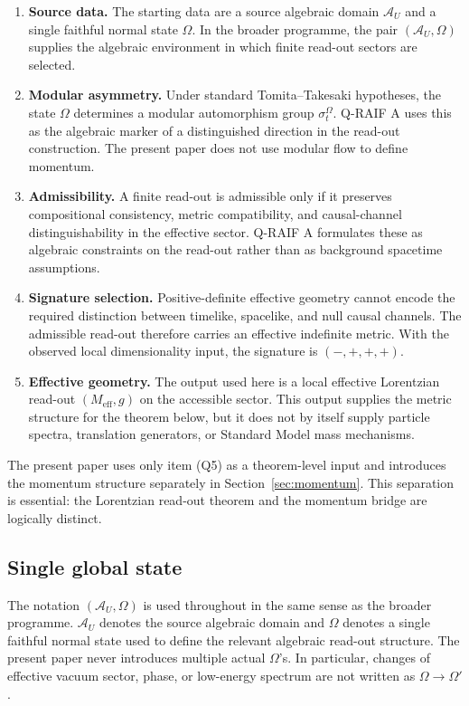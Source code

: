 \documentclass[12pt,a4paper]{article}
\theoremstyle{definition}
\theoremstyle{remark}
\newcommand{\AU}{\mathcal{A}_U}
\newcommand{\Meff}{M_{\mathrm{eff}}}
\newcommand{\Omegastate}{\Omega}
\begin{document}
\begin{enumerate}[label=(Q\arabic*), leftmargin=*]
\item \textbf{Source data.} The starting data are a source algebraic domain $\AU$ and a single faithful normal state $\Omegastate$. In the broader programme, the pair $(\AU,\Omegastate)$ supplies the algebraic environment in which finite read-out sectors are selected.
\item \textbf{Modular asymmetry.} Under standard Tomita--Takesaki hypotheses, the state $\Omegastate$ determines a modular automorphism group $\sigma_t^\Omegastate$. Q-RAIF A uses this as the algebraic marker of a distinguished direction in the read-out construction. The present paper does not use modular flow to define momentum.
\item \textbf{Admissibility.} A finite read-out is admissible only if it preserves compositional consistency, metric compatibility, and causal-channel distinguishability in the effective sector. Q-RAIF A formulates these as algebraic constraints on the read-out rather than as background spacetime assumptions.
\item \textbf{Signature selection.} Positive-definite effective geometry cannot encode the required distinction between timelike, spacelike, and null causal channels. The admissible read-out therefore carries an effective indefinite metric. With the observed local dimensionality input, the signature is $(-,+,+,+)$.
\item \textbf{Effective geometry.} The output used here is a local effective Lorentzian read-out $(\Meff,g)$ on the accessible sector. This output supplies the metric structure for the theorem below, but it does not by itself supply particle spectra, translation generators, or Standard Model mass mechanisms.
\end{enumerate}

The present paper uses only item (Q5) as a theorem-level input and introduces the momentum structure separately in Section~\ref{sec:momentum}. This separation is essential: the Lorentzian read-out theorem and the momentum bridge are logically distinct.

\subsection{Single global state}

The notation $(\AU,\Omegastate)$ is used throughout in the same sense as the broader programme. $\AU$ denotes the source algebraic domain and $\Omegastate$ denotes a single faithful normal state used to define the relevant algebraic read-out structure. The present paper never introduces multiple actual $\Omegastate$'s. In particular, changes of effective vacuum sector, phase, or low-energy spectrum are not written as $\Omegastate\to\Omegastate'$.
\end{document}
